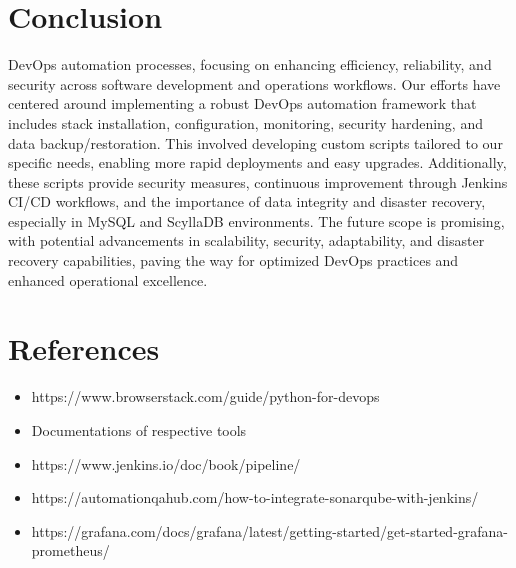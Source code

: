 \documentclass[12pt,a4paper,oneside]{report}
\begin{document}
\chapter{Conclusion}
\hspace{20pt}  DevOps automation processes, focusing on enhancing efficiency, reliability, and security across software development and operations workflows. Our efforts have centered around implementing a robust DevOps automation framework that includes stack installation, configuration, monitoring, security hardening, and data backup/restoration. This involved developing custom scripts tailored to our specific needs, enabling more rapid deployments and easy upgrades. Additionally, these scripts provide security measures, continuous improvement through Jenkins CI/CD workflows, and the importance of data integrity and disaster recovery, especially in MySQL and ScyllaDB environments. The future scope is promising, with potential advancements in scalability, security, adaptability, and disaster recovery capabilities, paving the way for optimized DevOps practices and enhanced operational excellence.

\newpage
\chapter{References}
\begin{itemize}
\item{https://www.browserstack.com/guide/python-for-devops}
\item{Documentations of respective tools}
\item{https://www.jenkins.io/doc/book/pipeline/}
\item{https://automationqahub.com/how-to-integrate-sonarqube-with-jenkins/}
\item{https://grafana.com/docs/grafana/latest/getting-started/get-started-grafana-prometheus/}
\end{itemize}
\end{document}
